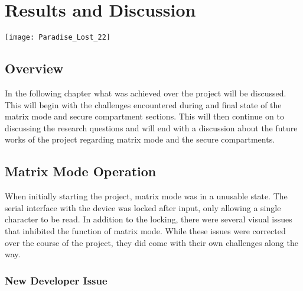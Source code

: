 
\chapter{Results and Discussion} %

\texttt{[image: Paradise\_Lost\_22]}

\label{Chapter 7} %

\section{Overview}

In the following chapter what was achieved over the project will be discussed. This will begin with the challenges encountered during and final state of the matrix mode and secure compartment sections. This will then continue on to discussing the research questions and will end with a discussion about the future works of the project regarding matrix mode and the secure compartments.


\section{Matrix Mode Operation}

\label{Ch7 Sec1}

When initially starting the project, matrix mode was in a unusable state. The serial interface with the device was locked after input, only allowing a single character to be read. In addition to the locking, there were several visual issues that inhibited the function of matrix mode. While these issues were corrected over the course of the project, they did come with their own challenges along the way. 

\subsection{New Developer Issue}

\label{Ch7 Sec1 Sub1}

